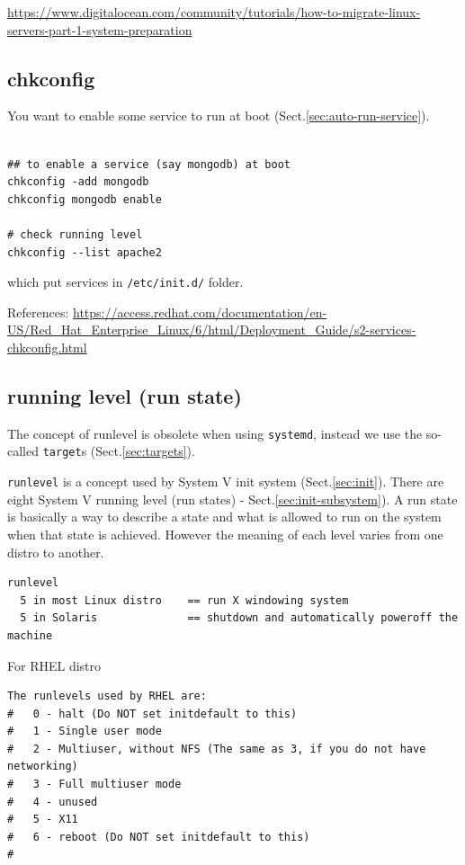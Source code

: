\url{https://www.digitalocean.com/community/tutorials/how-to-migrate-linux-servers-part-1-system-preparation}

\subsection{chkconfig}
\label{sec:chkconfig}

You want to enable some service to run at boot
(Sect.\ref{sec:auto-run-service}).

\begin{verbatim}

## to enable a service (say mongodb) at boot
chkconfig -add mongodb
chkconfig mongodb enable

# check running level 
chkconfig --list apache2
\end{verbatim}
which put services in \verb!/etc/init.d/! folder.

References:
\url{https://access.redhat.com/documentation/en-US/Red_Hat_Enterprise_Linux/6/html/Deployment_Guide/s2-services-chkconfig.html}

\subsection{running level (run state)} 
\label{sec:running-level}
\label{sec:runstate}
\label{sec:RedHat-run-level}

The concept of runlevel is obsolete when using \verb!systemd!, instead we use
the so-called \verb!target!s (Sect.\ref{sec:targets}). 

\verb!runlevel! is a concept used by System V init system (Sect.\ref{sec:init}).
There are eight System V running level (run states) -
Sect.\ref{sec:init-subsystem}). A run state is basically a way to describe a
state and what is allowed to run on the system when that state is achieved.
However the meaning of each level varies from one distro to another.

\begin{verbatim}
runlevel 
  5 in most Linux distro    == run X windowing system
  5 in Solaris              == shutdown and automatically poweroff the machine
\end{verbatim}

For RHEL distro
\begin{verbatim}
The runlevels used by RHEL are:
#   0 - halt (Do NOT set initdefault to this)
#   1 - Single user mode
#   2 - Multiuser, without NFS (The same as 3, if you do not have networking)
#   3 - Full multiuser mode
#   4 - unused
#   5 - X11
#   6 - reboot (Do NOT set initdefault to this)
#
\end{verbatim} 

